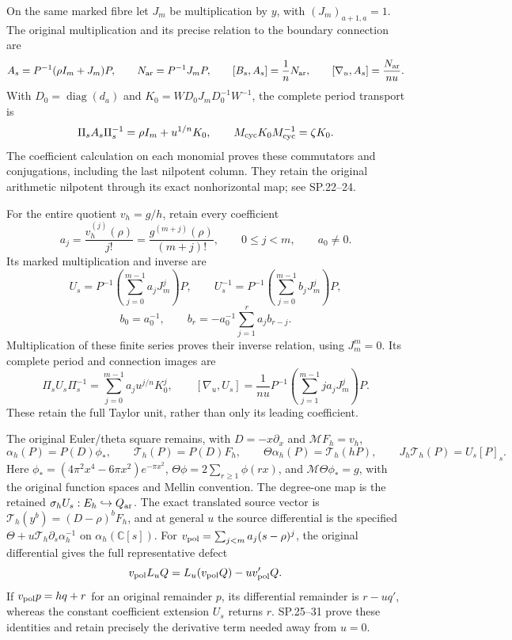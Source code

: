 On the same marked fibre let \(J_m\) be multiplication by \(y\), with
\((J_m)_{a+1,a}=1\).  The original multiplication and its precise
relation to the boundary connection are
\[
 A_s=P^{-1}(\rho I_m+J_m)P,\qquad
 N_{\rm ar}=P^{-1}J_mP,\qquad
 [B_s,A_s]=\frac1nN_{\rm ar},\qquad
 [\nabla_u,A_s]=\frac{N_{\rm ar}}{nu}.
\]
With \(D_0=\operatorname{diag}(d_a)\) and
\(K_0=WD_0J_mD_0^{-1}W^{-1}\), the complete period transport is
\[
 \Pi_sA_s\Pi_s^{-1}=\rho I_m+u^{1/n}K_0,\qquad
 M_{\rm cyc}K_0M_{\rm cyc}^{-1}=\zeta K_0 .
\]
The coefficient calculation on each monomial proves these
commutators and conjugations, including the last nilpotent column.
They retain the original arithmetic nilpotent through its exact
nonhorizontal map; see SP.22--24.

For the entire quotient \(v_h=g/h\), retain every coefficient
\[
 a_j=\frac{v_h^{(j)}(\rho)}{j!}
     =\frac{g^{(m+j)}(\rho)}{(m+j)!},\qquad 0\leq j<m,
 \qquad a_0\ne0 .
\]
Its marked multiplication and inverse are
\[
 U_s=P^{-1}\left(\sum_{j=0}^{m-1}a_jJ_m^j\right)P,\qquad
 U_s^{-1}=P^{-1}\left(\sum_{j=0}^{m-1}b_jJ_m^j\right)P,
\]
\[
 b_0=a_0^{-1},\qquad
 b_r=-a_0^{-1}\sum_{j=1}^r a_jb_{r-j}.
\]
Multiplication of these finite series proves their inverse relation,
using \(J_m^m=0\).  Its complete period and connection images are
\[
 \Pi_sU_s\Pi_s^{-1}
    =\sum_{j=0}^{m-1}a_j u^{j/n}K_0^j,\qquad
 [\nabla_u,U_s]
    =\frac1{nu}P^{-1}
          \left(\sum_{j=1}^{m-1}j a_jJ_m^j\right)P.
\]
These retain the full Taylor unit, rather than only its leading
coefficient.

The original Euler/theta square remains, with
\(D=-x\partial_x\) and \(\mathcal MF_h=v_h\),
\[
 \alpha_h(P)=P(D)\phi_*,\qquad
 \mathcal T_h(P)=P(D)F_h,\qquad
 \Theta\alpha_h(P)=\mathcal T_h(hP),\qquad
 J_h\mathcal T_h(P)=U_s[P]_s.
\]
Here
\(\phi_*=(4\pi^2x^4-6\pi x^2)e^{-\pi x^2}\),
\(\Theta\phi=2\sum_{r\geq1}\phi(rx)\), and
\(\mathcal M\Theta\phi_*=g\), with the original function spaces and
Mellin convention.  The degree-one map is the retained
\(\sigma_hU_s:E_h\hookrightarrow Q_{\rm ar}\).
The exact translated source vector is
\(\mathcal T_h(y^b)=(D-\rho)^bF_h\), and at general \(u\) the
source differential is the specified
\(\Theta+u\mathcal T_h\partial_s\alpha_h^{-1}\) on
\(\alpha_h(\mathbb C[s])\).
For \(v_{\rm pol}=\sum_{j<m}a_j(s-\rho)^j\), the original differential
gives the full representative defect
\[
 v_{\rm pol}L_uQ=L_u(v_{\rm pol}Q)-u v_{\rm pol}'Q.
\]
If \(v_{\rm pol}p=hq+r\) for an original remainder \(p\), its
differential remainder is \(r-uq'\), whereas the constant
coefficient extension \(U_s\) returns \(r\).
SP.25--31 prove these identities and retain precisely the derivative
term needed away from \(u=0\).

